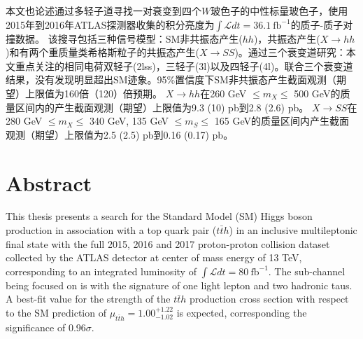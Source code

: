 本文也论述通过多轻子道寻找一对衰变到四个$W$玻色子的中性标量玻色子，使用2015年到2016年ATLAS探测器收集的积分亮度为$\int \mathcal{L}dt=36.1~\text{fb}^{-1}$的质子-质子对撞数据。
该搜寻包括三种信号模型：SM非共振态产生($hh$)，共振态产生($X\rightarrow hh$)和有两个重质量类希格斯粒子的共振态产生($X\rightarrow SS$)。通过三个衰变道研究：本文重点关注的相同电荷双轻子(2lss)，三轻子(3l)以及四轻子(4l)。联合三个衰变道结果，没有发现明显超出SM迹象。95\%置信度下SM非共振态产生截面观测（期望）上限值为160倍（120）倍预期。
$X\rightarrow hh$在260 GeV $\leq m_X\leq$ 500 GeV的质量区间内的产生截面观测（期望）上限值为9.3 (10) pb到2.8 (2.6) pb。
$X\rightarrow SS$在280 GeV $\leq m_X\leq$ 340 GeV, 135 GeV $\leq m_S\leq$ 165 GeV的质量区间内产生截面观测（期望）上限值为2.5 (2.5) pb到0.16 (0.17) pb。

\chapter*{Abstract}%

This thesis presents a search for the Standard Model (SM) Higgs boson production in association with a top quark pair ($t\bar{t}h$)
 in an inclusive multileptonic final state with the full 2015, 2016 and 2017 proton-proton collision dataset collected by
the ATLAS detector at center of mass energy of 13 TeV, corresponding to an integrated luminosity of $\int \mathcal{L}dt=80~\text{fb}^{-1}$.
The sub-channel being focused on is \ltwotau with the signature of one light lepton and two hadronic taus. A best-fit value for the strength of the $t\bar{t}h$ production cross section
with respect to the SM prediction of $\mu_{t\bar{t}h}=1.00^{+1.22}_{-1.02}$ is expected, corresponding the significance of 0.96$\sigma$.

